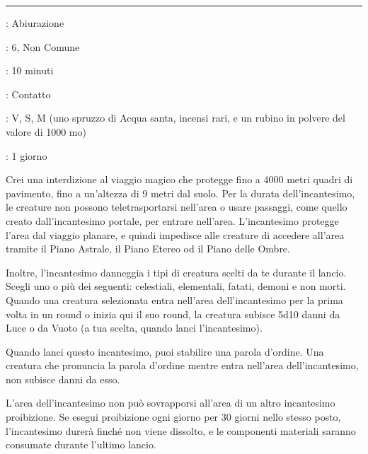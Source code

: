 \begin{multicols}{2}
\smallskip\noindent\rule{\linewidth}{2pt} \hypertarget{Proibizione}{}\smallskip{}
\noindent
\begin{description}[noitemsep, topsep=0pt, parsep=0pt, partopsep=0pt, leftmargin=0cm, labelwidth=2.8cm]
	\item[\textbf{Lista di Magia}]: Abiurazione
	\item[\textbf{Livello}]: 6, Non Comune
	\item[\textbf{T. di Lancio}]: 10 minuti
	\item[\textbf{Gittata}]: Contatto
	\item[\textbf{Componenti}]: V, S, M (uno spruzzo di Acqua santa, incensi rari, e un rubino in polvere del valore di 1000 mo)
	\item[\textbf{Durata}]: 1 giorno
\end{description}

Crei una interdizione al viaggio magico che protegge fino a 4000 metri quadri di pavimento, fino a un'altezza di 9 metri dal suolo. Per la durata dell'incantesimo, le creature non possono teletrasportarsi nell'area o usare passaggi, come quello creato dall'incantesimo portale, per entrare nell'area. L'incantesimo protegge l'area dal viaggio planare, e quindi impedisce alle creature di accedere all'area tramite il Piano Astrale, il Piano Etereo od il Piano delle Ombre.

Inoltre, l'incantesimo danneggia i tipi di creatura scelti da te durante il lancio. Scegli uno o più dei seguenti: celestiali, elementali, fatati, demoni e non morti. Quando una creatura selezionata entra nell'area dell'incantesimo per la prima volta in un round o inizia qui il suo round, la creatura subisce 5d10 danni da Luce o da Vuoto (a tua scelta, quando lanci l'incantesimo).

Quando lanci questo incantesimo, puoi stabilire una parola d'ordine. Una creatura che pronuncia la parola d'ordine mentre entra nell'area dell'incantesimo, non subisce danni da esso.

L'area dell'incantesimo non può sovrapporsi all'area di un altro incantesimo proibizione. Se esegui proibizione ogni giorno per 30 giorni nello stesso posto, l'incantesimo durerà finché non viene dissolto, e le componenti materiali saranno consumate durante l'ultimo lancio.


\end{multicols}
